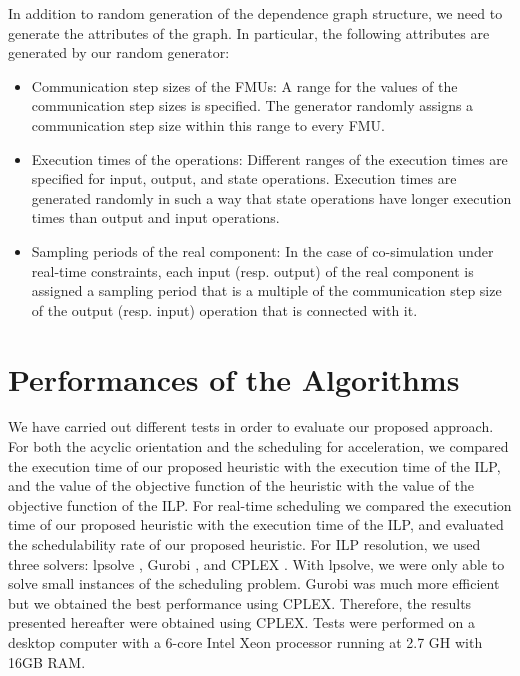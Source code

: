 In addition to random generation of the dependence graph structure, we need to generate the attributes of the graph. In particular, the following attributes are generated by our random generator:
\begin{itemize}
\item Communication step sizes of the FMUs: A range for the values of the communication step sizes is specified. The generator randomly assigns a communication step size within this range to every FMU. 
\item Execution times of the operations: Different ranges of the execution times are specified for input, output, and state operations. Execution times are generated randomly in such a way that state operations have longer execution times than output and input operations.
\item Sampling periods of the real component: In the case of co-simulation under real-time constraints, each input (resp. output) of the real component is assigned a sampling period that is a multiple of the communication step size of the output (resp. input) operation that is connected with it.
\end{itemize}

\section{Performances of the Algorithms}

We have carried out different tests in order to evaluate our proposed approach. For both the acyclic orientation and the scheduling for acceleration, we compared the execution time of our proposed heuristic with the execution time of the ILP, and the value of the objective function of the heuristic with the value of the objective function of the ILP. For real-time scheduling we compared the execution time of our proposed heuristic with the execution time of the ILP, and evaluated the schedulability rate of our proposed heuristic. For ILP resolution, we used three solvers: lpsolve \cite{berkelaar:2004}, Gurobi \cite{gurobi:2016}, and CPLEX \cite{cplex:2017}. With lpsolve, we were only able to solve small instances of the scheduling problem. Gurobi was much more efficient but we obtained the best performance using CPLEX. Therefore, the results presented hereafter were obtained using CPLEX. %
Tests were performed on a desktop computer with a 6-core Intel Xeon processor running at 2.7 GH with 16GB RAM.

